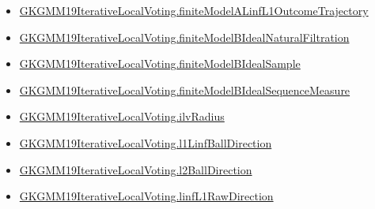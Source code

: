 \documentclass[10pt]{article}
\begin{document}
\begin{itemize}
\item \hyperlink{governing-declaration-a385449c1da028f5}{GKGMM19\allowbreak{}Iterative\allowbreak{}Local\allowbreak{}Voting.\allowbreak{}finite\allowbreak{}Model\allowbreak{}A\allowbreak{}Linf\allowbreak{}L1\allowbreak{}Outcome\allowbreak{}Trajectory}
\item \hyperlink{governing-declaration-48e5deffe9d3b69f}{GKGMM19\allowbreak{}Iterative\allowbreak{}Local\allowbreak{}Voting.\allowbreak{}finite\allowbreak{}Model\allowbreak{}B\allowbreak{}Ideal\allowbreak{}Natural\allowbreak{}Filtration}
\item \hyperlink{governing-declaration-41e1ceb0696b5f21}{GKGMM19\allowbreak{}Iterative\allowbreak{}Local\allowbreak{}Voting.\allowbreak{}finite\allowbreak{}Model\allowbreak{}B\allowbreak{}Ideal\allowbreak{}Sample}
\item \hyperlink{governing-declaration-4a521de5e9fb0dd0}{GKGMM19\allowbreak{}Iterative\allowbreak{}Local\allowbreak{}Voting.\allowbreak{}finite\allowbreak{}Model\allowbreak{}B\allowbreak{}Ideal\allowbreak{}Sequence\allowbreak{}Measure}
\item \hyperlink{governing-declaration-2cfd8c76662024e1}{GKGMM19\allowbreak{}Iterative\allowbreak{}Local\allowbreak{}Voting.\allowbreak{}ilv\allowbreak{}Radius}
\item \hyperlink{governing-declaration-eecd4a34cea3f734}{GKGMM19\allowbreak{}Iterative\allowbreak{}Local\allowbreak{}Voting.\allowbreak{}l1\allowbreak{}Linf\allowbreak{}Ball\allowbreak{}Direction}
\item \hyperlink{governing-declaration-ede5cbc7998c0028}{GKGMM19\allowbreak{}Iterative\allowbreak{}Local\allowbreak{}Voting.\allowbreak{}l2\allowbreak{}Ball\allowbreak{}Direction}
\item \hyperlink{governing-declaration-be7dacc9d4750461}{GKGMM19\allowbreak{}Iterative\allowbreak{}Local\allowbreak{}Voting.\allowbreak{}linf\allowbreak{}L1\allowbreak{}Raw\allowbreak{}Direction}
\end{itemize}
\end{document}
